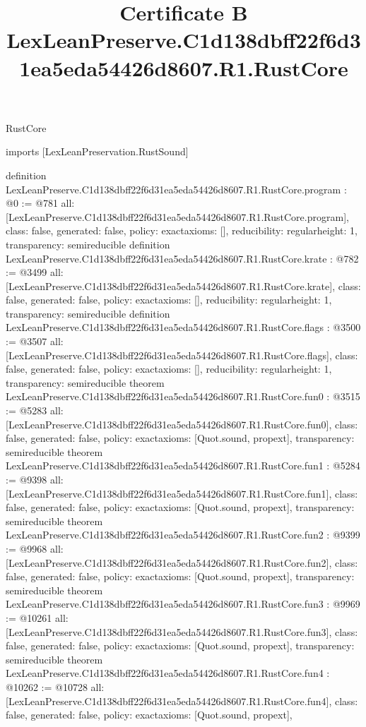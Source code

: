 \begin{lexlean}{RustCore}
\title{Certificate B LexLeanPreserve.C1d138dbff22f6d31ea5eda54426d8607.R1.RustCore}
\begin{coremodule}
imports [LexLeanPreservation.RustSound]

definition LexLeanPreserve.C1d138dbff22f6d31ea5eda54426d8607.R1.RustCore.program : @0 := @781 {
  all: [LexLeanPreserve.C1d138dbff22f6d31ea5eda54426d8607.R1.RustCore.program],
  class: false,
  generated: false,
  policy: exact{axioms: []},
  reducibility: regular{height: 1},
  transparency: semireducible
}
definition LexLeanPreserve.C1d138dbff22f6d31ea5eda54426d8607.R1.RustCore.krate : @782 := @3499 {
  all: [LexLeanPreserve.C1d138dbff22f6d31ea5eda54426d8607.R1.RustCore.krate],
  class: false,
  generated: false,
  policy: exact{axioms: []},
  reducibility: regular{height: 1},
  transparency: semireducible
}
definition LexLeanPreserve.C1d138dbff22f6d31ea5eda54426d8607.R1.RustCore.flags : @3500 := @3507 {
  all: [LexLeanPreserve.C1d138dbff22f6d31ea5eda54426d8607.R1.RustCore.flags],
  class: false,
  generated: false,
  policy: exact{axioms: []},
  reducibility: regular{height: 1},
  transparency: semireducible
}
theorem LexLeanPreserve.C1d138dbff22f6d31ea5eda54426d8607.R1.RustCore.fun0 : @3515 := @5283 {
  all: [LexLeanPreserve.C1d138dbff22f6d31ea5eda54426d8607.R1.RustCore.fun0],
  class: false,
  generated: false,
  policy: exact{axioms: [Quot.sound, propext]},
  transparency: semireducible
}
theorem LexLeanPreserve.C1d138dbff22f6d31ea5eda54426d8607.R1.RustCore.fun1 : @5284 := @9398 {
  all: [LexLeanPreserve.C1d138dbff22f6d31ea5eda54426d8607.R1.RustCore.fun1],
  class: false,
  generated: false,
  policy: exact{axioms: [Quot.sound, propext]},
  transparency: semireducible
}
theorem LexLeanPreserve.C1d138dbff22f6d31ea5eda54426d8607.R1.RustCore.fun2 : @9399 := @9968 {
  all: [LexLeanPreserve.C1d138dbff22f6d31ea5eda54426d8607.R1.RustCore.fun2],
  class: false,
  generated: false,
  policy: exact{axioms: [Quot.sound, propext]},
  transparency: semireducible
}
theorem LexLeanPreserve.C1d138dbff22f6d31ea5eda54426d8607.R1.RustCore.fun3 : @9969 := @10261 {
  all: [LexLeanPreserve.C1d138dbff22f6d31ea5eda54426d8607.R1.RustCore.fun3],
  class: false,
  generated: false,
  policy: exact{axioms: [Quot.sound, propext]},
  transparency: semireducible
}
theorem LexLeanPreserve.C1d138dbff22f6d31ea5eda54426d8607.R1.RustCore.fun4 : @10262 := @10728 {
  all: [LexLeanPreserve.C1d138dbff22f6d31ea5eda54426d8607.R1.RustCore.fun4],
  class: false,
  generated: false,
  policy: exact{axioms: [Quot.sound, propext]},
}
\end{coremodule}
\end{lexlean}
